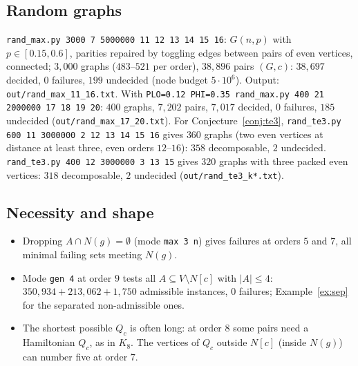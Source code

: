 \documentclass[11pt]{amsart}
\theoremstyle{definition}
\begin{document}
\subsection*{Random graphs}
\texttt{rand\_max.py 3000 7 5000000 11 12 13 14 15 16}: $G(n,p)$ with $p\in[0.15,0.6]$, parities
repaired by toggling edges between pairs of even vertices, connected; $3{,}000$ graphs ($483$--$521$
per order), $38{,}896$ pairs $(G,c)$: $38{,}697$ decided, $0$ failures, $199$ undecided (node
budget $5\cdot10^6$). Output: \texttt{out/rand\_max\_11\_16.txt}. With
\texttt{PLO=0.12 PHI=0.35 rand\_max.py 400 21 2000000 17 18 19 20}: $400$ graphs, $7{,}202$ pairs,
$7{,}017$ decided, $0$ failures, $185$ undecided (\texttt{out/rand\_max\_17\_20.txt}). For
Conjecture~\ref{conj:te3}, \texttt{rand\_te3.py 600 11 3000000 2 12 13 14 15 16} gives $360$ graphs
(two even vertices at distance at least three, even orders $12$--$16$): $358$ decomposable, $2$
undecided. \texttt{rand\_te3.py 400 12 3000000 3 13 15} gives $320$ graphs with three packed even
vertices: $318$ decomposable, $2$ undecided (\texttt{out/rand\_te3\_k*.txt}).

\subsection*{Necessity and shape}
\begin{itemize}
\item Dropping $A\cap N(g)=\emptyset$ (mode \texttt{max~3~n}) gives failures at orders $5$ and $7$,
all minimal failing sets meeting $N(g)$.
\item Mode \texttt{gen~4} at order $9$ tests all $A\subseteq V\setminus N[c]$ with $|A|\le4$:
$350{,}934+213{,}062+1{,}750$ admissible instances, $0$ failures; Example~\ref{ex:sep} for the
separated non-admissible ones.
\item The shortest possible $Q_c$ is often long: at order $8$ some pairs need a Hamiltonian $Q_c$, as
in $K_8$. The vertices of $Q_c$ outside $N[c]$ (inside $N(g)$) can number five at order $7$.
\end{itemize}
\end{document}
